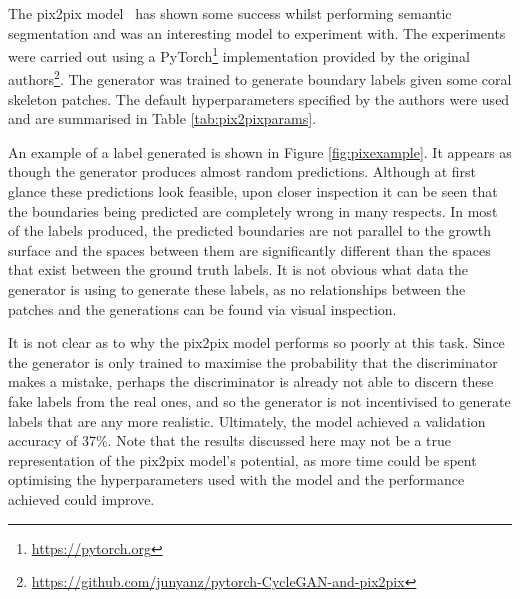 The pix2pix model~\cite{pix2pix} has shown some success whilst performing semantic segmentation and was an interesting model to experiment with. The experiments were carried out using a PyTorch\footnote{\url{https://pytorch.org}} implementation provided by the original authors\footnote{\url{https://github.com/junyanz/pytorch-CycleGAN-and-pix2pix}}. The generator was trained to generate boundary labels given some coral skeleton patches. The default hyperparameters specified by the authors were used and are summarised in Table \ref{tab:pix2pixparams}.

An example of a label generated is shown in Figure \ref{fig:pixexample}. It appears as though the generator produces almost random predictions. Although at first glance these predictions look feasible, upon closer inspection it can be seen that the boundaries being predicted are completely wrong in many respects. In most of the labels produced, the predicted boundaries are not parallel to the growth surface and the spaces between them are significantly different than the spaces that exist between the ground truth labels. It is not obvious what data the generator is using to generate these labels, as no relationships between the patches and the generations can be found via visual inspection.

It is not clear as to why the pix2pix model performs so poorly at this task. Since the generator is only trained to maximise the probability that the discriminator makes a mistake, perhaps the discriminator is already not able to discern these fake labels from the real ones, and so the generator is not incentivised to generate labels that are any more realistic. Ultimately, the model achieved a validation accuracy of 37\%. Note that the results discussed here may not be a true representation of the pix2pix model's potential, as more time could be spent optimising the hyperparameters used with the model and the performance achieved could improve.

